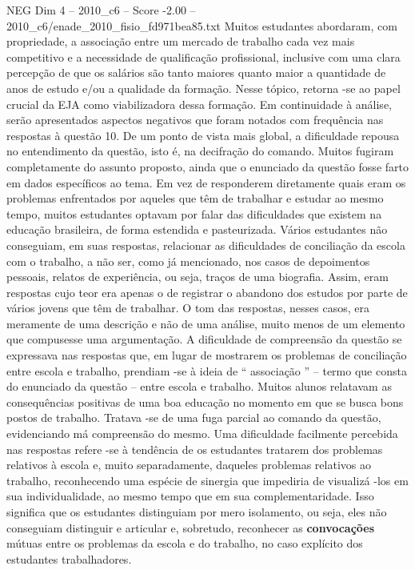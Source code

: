 \begin{textsample}{NEG Dim 4 – 2010\_c6 – Score -2.00 – 2010\_c6/enade\_2010\_fisio\_fd971bea85.txt}
Muitos estudantes abordaram, com propriedade, a associação entre um mercado de trabalho cada vez mais competitivo e a necessidade de qualificação profissional, inclusive com uma clara percepção de que os salários são tanto maiores quanto maior a quantidade de anos de estudo e/ou a qualidade da formação.
Nesse tópico, retorna -se ao papel crucial da EJA como viabilizadora dessa formação.
Em continuidade à análise, serão apresentados aspectos negativos que foram notados com frequência nas respostas à questão 10.
De um ponto de vista mais global, a dificuldade repousa no entendimento da questão, isto é, na decifração do comando.
Muitos fugiram completamente do assunto proposto, ainda que o enunciado da questão fosse farto em dados específicos ao tema.
Em vez de responderem diretamente quais eram os problemas enfrentados por aqueles que têm de trabalhar e estudar ao mesmo tempo, muitos estudantes optavam por falar das dificuldades que existem na educação brasileira, de forma estendida e pasteurizada.
Vários estudantes não conseguiam, em suas respostas, relacionar as dificuldades de conciliação da escola com o trabalho, a não ser, como já mencionado, nos casos de depoimentos pessoais, relatos de experiência, ou seja, traços de uma biografia.
Assim, eram respostas cujo teor era apenas o de registrar o abandono dos estudos por parte de vários jovens que têm de trabalhar.
O tom das respostas, nesses casos, era meramente de uma descrição e não de uma análise, muito menos de um elemento que compusesse uma argumentação.
A dificuldade de compreensão da questão se expressava nas respostas que, em lugar de mostrarem os problemas de conciliação entre escola e trabalho, prendiam -se à ideia de “ associação ” – termo que consta do enunciado da questão – entre escola e trabalho.
Muitos alunos relatavam as consequências positivas de uma boa educação no momento em que se busca bons postos de trabalho.
Tratava -se de uma fuga parcial ao comando da questão, evidenciando má compreensão do mesmo.
Uma dificuldade facilmente percebida nas respostas refere -se à tendência de os estudantes tratarem dos problemas relativos à escola e, muito separadamente, daqueles problemas relativos ao trabalho, reconhecendo uma espécie de sinergia que impediria de visualizá -los em sua individualidade, ao mesmo tempo que em sua complementaridade.
Isso significa que os estudantes distinguiam por mero isolamento, ou seja, eles não conseguiam distinguir e articular e, sobretudo, reconhecer as \textbf{convocações} mútuas entre os problemas da escola e do trabalho, no caso explícito dos estudantes trabalhadores.

\end{textsample}
